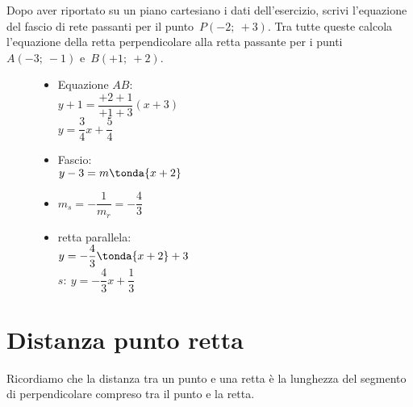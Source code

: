  \begin{esempio}
  Dopo aver riportato su un piano cartesiano i dati dell'esercizio,
  scrivi l'equazione del fascio di rete passanti per il punto~\(P(-2;~+3)\).
  Tra tutte queste calcola l'equazione della retta perpendicolare alla retta 
  passante per i punti~\(A(-3;~-1)\) e~\(B(+1;~+2)\).

\begin{inaccessibleblock}
 \begin{figure}[h]
\centering \hspace{-5mm}
 \begin{minipage}[]{.40\textwidth}
  \begin{itemize}
  \item Equazione \(AB\):\\
  \(y +1 = \dfrac{+2 +1}{+1 +3} (x +3)\)\\
  \(y = \dfrac{3}{4} x +\dfrac{5}{4}\)
  \item Fascio: \\
  \(y -3 = m \tonda{x +2}\)
  \item \(m_s = - \dfrac{1}{m_r} = -\dfrac{4}{3}\)
  \item retta parallela: \\
  \(y = -\dfrac{4}{3} \tonda{x +2} +3\)\\
  \(s:~y = -\dfrac{4}{3} x +\dfrac{1}{3}\)
  \end{itemize}
 \end{minipage}
 \begin{minipage}[]{.60\textwidth}
   \centering \duepuntiperp
 \end{minipage}
\label{fig:duepuntiperp}
\end{figure}
\end{inaccessibleblock}
 \end{esempio}

\section{Distanza punto retta}
\label{sec:retta_distanzapuntoretta}

Ricordiamo che la distanza tra un punto e una retta è la lunghezza del 
segmento di perpendicolare compreso tra il punto e la retta.


